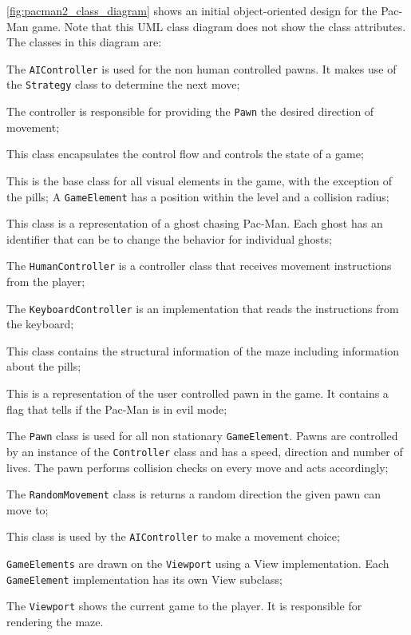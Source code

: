 %
\autoref{fig:pacman2_class_diagram} shows an initial object-oriented design for the Pac-Man game.
Note that this UML class diagram does not show the class attributes.
The classes in this diagram are:
\begin{description}[noitemsep,style=sameline,leftmargin=32mm]
	\item[AIController] The \lstinline|AIController| is used for the non human controlled pawns. It makes
		use of the \lstinline|Strategy| class	to determine the next move;
	\item[Controller] The controller is responsible for providing the \lstinline|Pawn| the desired direction of movement;
	\item[Game] This class encapsulates the control flow and controls the state of a game;
	\item[GameElement] This is the base class for all visual elements in the game, with the exception of the pills;
		A \lstinline|GameElement| has a position within the level and a collision radius;
	\item[Ghost] This class is a representation of a ghost chasing Pac-Man. Each ghost has an identifier that can be
		to change the behavior for individual ghosts;		
	\item[HumanController] The \lstinline|HumanController| is a controller class that receives movement instructions
		from the player;
	\item[KeyboardController] The \lstinline|KeyboardController| is an implementation that reads the instructions 
		from the keyboard;			
	\item[Level] This class contains the structural information of the maze including information about the pills;		
	\item[Pacman] This is a representation of the user controlled pawn in the game. It contains a flag that tells if
		the Pac-Man is in evil mode;	
	\item[Pawn] The \lstinline|Pawn| class is used for all non stationary \lstinline|GameElement|. Pawns are 
		controlled by an instance of the \lstinline|Controller| class and has a speed, direction and number of lives.
		The pawn performs collision checks on every move and acts accordingly;
	\item[RandomMovement] The \lstinline|RandomMovement| class is returns a random direction the given 
		pawn can move to;
	\item[Strategy] This class is used by the \lstinline|AIController| to make a movement choice;
	\item[View] \lstinline|GameElements| are drawn on the \lstinline|Viewport| using a View 
		implementation. Each \lstinline|GameElement| implementation has	its own View subclass;
	\item[Viewport] The \lstinline|Viewport| shows the current game to the player. It is responsible for rendering 
		the maze. 
\end{description}

